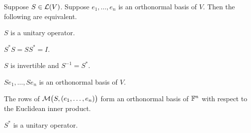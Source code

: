 \begin{result}\label{ax:7.53}
Suppose $S\in\mathcal{L}(V)$. Suppose $e_1,\dots,e_n$ is an orthonormal basis of $V$.
Then the following are equivalent.
\begin{parts}
\item $S$ is a unitary operator.
\item $S^*S=SS^*=I$.
\item $S$ is invertible and $S^{-1}=S^*$.
\item $Se_1,\dots,Se_n$ is an orthonormal basis of $V$.
\item The rows of $\mathcal{M}\bigl(S,(e_1,\dots,e_n)\bigr)$ form an orthonormal basis
  of $\mathbb{F}^n$ with respect to the Euclidean inner product.
\item $S^*$ is a unitary operator.
\end{parts}
\end{result}

